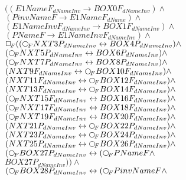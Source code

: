 \documentclass[a4paper,10pt]{article}
\begin{document}
 \newcommand{\nxt}{{\ensuremath\raisebox{0.25ex}{\text{\scriptsize$\bigcirc$}}}}
\newcommand{\Rdiamond}{\Diamond_{\!F}}
\newcommand{\Rbox}{\Box_{\!F}}
\newcommand{\Rnext}{\nxt_{\!F}}
\newcommand{\Ldiamond}{\Diamond_{\!P}}
\newcommand{\Lbox}{\Box_{\!P}}
\newcommand{\Lnext}{\nxt_{\!P}}
\newcommand{\SVdiamond}{\mathop{\ooalign{$\Diamond$ \cr \kern0.5ex
    \raisebox{0.35ex}{\scalebox{0.7}{$*$}}} \kern-0.9ex}}
\newcommand{\SVbox}{\mathop{\ooalign{$\Box$ \cr \kern0.42ex
    \raisebox{0.3ex}{\scalebox{0.7}{$*$}}} \kern-0.9ex}}


$((E1NameF_{dNameInv} \rightarrow BOX0F_{dNameInv}) \land $ \\ 
 $ (PinvNameF \rightarrow E1NameF_{dName}) \land $ \\ 
 $ (E1NameInvF_{dNameInv} \rightarrow BOX1F_{dNameInv}) \land $ \\ 
 $ (PNameF \rightarrow E1NameInvF_{dNameInv}) \land $ \\ 
 $  \Rbox (( \Rnext NXT3P_{dNameInv} \leftrightarrow BOX4P_{dNameInv}) \land $ \\ 
 $ ( \Rnext NXT5P_{dNameInv} \leftrightarrow BOX6P_{dNameInv}) \land $ \\ 
 $ ( \Rnext NXT7P_{dNameInv} \leftrightarrow BOX8P_{dNameInv}) \land $ \\ 
 $ (NXT9F_{dNameInv} \leftrightarrow  \Rnext BOX10F_{dNameInv}) \land $ \\ 
 $ (NXT11F_{dNameInv} \leftrightarrow  \Rnext BOX12F_{dNameInv}) \land $ \\ 
 $ (NXT13F_{dNameInv} \leftrightarrow  \Rnext BOX14F_{dNameInv}) \land $ \\ 
 $ ( \Rnext NXT15F_{dNameInv} \leftrightarrow BOX16F_{dNameInv}) \land $ \\ 
 $ ( \Rnext NXT17F_{dNameInv} \leftrightarrow BOX18F_{dNameInv}) \land $ \\ 
 $ ( \Rnext NXT19F_{dNameInv} \leftrightarrow BOX20F_{dNameInv}) \land $ \\ 
 $ (NXT21P_{dNameInv} \leftrightarrow  \Rnext BOX22P_{dNameInv}) \land $ \\ 
 $ (NXT23P_{dNameInv} \leftrightarrow  \Rnext BOX24P_{dNameInv}) \land $ \\ 
 $ (NXT25P_{dNameInv} \leftrightarrow  \Rnext BOX26P_{dNameInv}) \land $ \\ 
 $ ( \Rnext BOX27P_{dNameInv} \leftrightarrow ( \Rnext PNameF \land $ \\ 
 $ BOX27P_{dNameInv})) \land $ \\ 
 $ ( \Rnext BOX28P_{dNameInv} \leftrightarrow ( \Rnext PinvNameF \land $ \\ 
\end{document}
